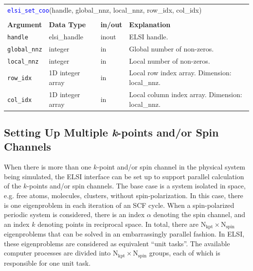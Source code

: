 \documentclass{report}
\newcommand{\api}[1]{\textcolor{blue}{\texttt{#1}}}
\begin{document}
\begin{tabular}[]{|p{20mm}|p{40mm}|p{10mm}|p{92mm}|}
\multicolumn{4}{l}{\api{elsi\_set\_coo}(handle, global\_nnz, local\_nnz, row\_idx, col\_idx)}\\
\multicolumn{4}{l}{}\\
\hline
\multicolumn{1}{|l|}{\textbf{Argument}} & \multicolumn{1}{l|}{\textbf{Data Type}} & \multicolumn{1}{l|}{\textbf{in/out}} & \multicolumn{1}{l|}{\textbf{Explanation}}\\
\hline
\texttt{handle}      & elsi\_handle     & inout & ELSI handle.\\
\hline
\texttt{global\_nnz} & integer          & in    & Global number of non-zeros.\\
\hline
\texttt{local\_nnz}  & integer          & in    & Local number of non-zeros.\\
\hline
\texttt{row\_idx}    & 1D integer array & in    & Local row index array. Dimension: local\_nnz.\\
\hline
\texttt{col\_idx}    & 1D integer array & in    & Local column index array. Dimension: local\_nnz.\\
\hline
\end{tabular}

\subsection{Setting Up Multiple \textit{k}-points and/or Spin Channels}
\label{subsec:setup_kpt}
When there is more than one $k$-point and/or spin channel in the physical system being simulated, the ELSI interface can be set up to support parallel calculation of the $k$-points and/or spin channels. The base case is a system isolated in space, e.g. free atoms, molecules, clusters, without spin-polarization. In this case, there is one eigenproblem in each iteration of an SCF cycle. When a spin-polarized periodic system is considered, there is an index $\alpha$ denoting the spin channel, and an index $k$ denoting points in reciprocal space. In total, there are $\text{N}_\text{kpt} \times \text{N}_\text{spin}$ eigenproblems that can be solved in an embarrassingly parallel fashion. In ELSI, these eigenproblems are considered as equivalent ``unit tasks''. The available computer processes are divided into $\text{N}_\text{kpt} \times \text{N}_\text{spin}$ groups, each of which is responsible for one unit task.
\end{document}
